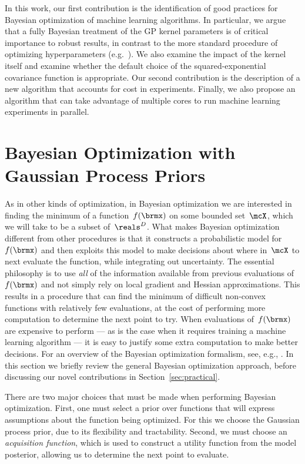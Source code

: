 \documentclass[aos,preprint]{imsart}
\begin{document}
In this work, our first contribution is the identification of good
practices for Bayesian optimization of machine learning algorithms.
In particular, we argue that a fully Bayesian treatment of the GP
kernel parameters is of critical importance to robust results, in
contrast to the more standard procedure of optimizing hyperparameters
(e.g.\ \citet{BergstraJ2011}).  We also examine the impact of the
kernel itself and examine whether the default choice of the
squared-exponential covariance function is appropriate.  Our second
contribution is the description of a new algorithm that accounts for
cost in experiments.  Finally, we also propose an algorithm that can
take advantage of multiple cores to run machine learning experiments
in parallel.

\section{Bayesian Optimization with Gaussian Process Priors}
As in other kinds of optimization, in Bayesian optimization we are
interested in finding the minimum of a function~$f(\brmx)$ on some
bounded set~$\mcX$, which we will take to be a subset of~$\reals^D$.
What makes Bayesian optimization different from other procedures is
that it constructs a probabilistic model for~$f(\brmx)$ and then
exploits this model to make decisions about where in~$\mcX$ to next
evaluate the function, while integrating out uncertainty.  The
essential philosophy is to use \emph{all} of the information available
from previous evaluations of~$f(\brmx)$ and not simply rely on local
gradient and Hessian approximations.  This results in a procedure that
can find the minimum of difficult non-convex functions with relatively
few evaluations, at the cost of performing more computation to
determine the next point to try.  When evaluations of~$f(\brmx)$ are
expensive to perform --- as is the case when it requires training a
machine learning algorithm --- it is easy to justify some extra
computation to make better decisions.  For an overview of the Bayesian
optimization formalism, see, e.g., \citet{brochu-etal-2010a}.  In this
section we briefly review the general Bayesian optimization approach,
before discussing our novel contributions in
Section~\ref{sec:practical}.

There are two major choices that must be made when performing Bayesian
optimization.  First, one must select a prior over functions that will
express assumptions about the function being optimized.  For this we
choose the Gaussian process prior, due to its flexibility and
tractability.  Second, we must choose an \emph{acquisition function},
which is used to construct a utility function from the model
posterior, allowing us to determine the next point to evaluate.
\end{document}
